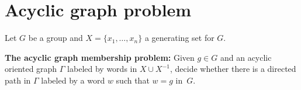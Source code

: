 \documentclass[10pt]{amsart}
\theoremstyle{definition}
\newtheorem{proposition}[theorem]{Proposition}
\def\P{{\mathbf{P}}}
\def\SSP{{\mathbf{SSP}}}
\def\BSMP{{\mathbf{BSMP}}}
\def\BKP{{\mathbf{BKP}}}
\def\KP{{\mathbf{KP}}}
\def\IKP{{\mathbf{IKP}}}
\def\SSOP{{\mathbf{SSOP}}}
\def\BSMOP{{\mathbf{BSMOP}}}
\begin{document}
%
%
%
%

\section{Acyclic graph problem}\label{sec:agp}
Let $G$ be a group and $X=\{x_1,\ldots,x_n\}$ a generating set for $G$.

\medskip
\noindent
{\bf The acyclic graph membership problem:} Given $g\in G$ and an acyclic oriented graph $\Gamma$ labeled by words in $X\cup X^{-1}$, decide whether there is a directed path in $\Gamma$ labeled by a word $w$ such that $w=g$ in~$G$.
\end{document}
